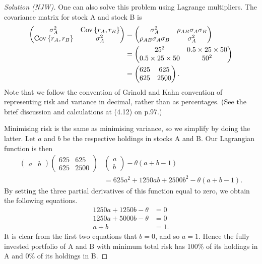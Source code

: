 \begin{proof}[Solution (NJW)]
One can also solve this problem using Lagrange multipliers. The covariance matrix for stock A and stock B is 
\begin{align*}
\begin{pmatrix}
\sigma_{A}^{2} & \mathrm{Cov}\left\lbrace r_{A}, r_{B}\right\rbrace \\
\mathrm{Cov}\left\lbrace r_{A}, r_{B}\right\rbrace & \sigma_{A}^{2}
\end{pmatrix}
&=
\begin{pmatrix}
\sigma_{A}^{2} & \rho_{AB}\sigma_{A}\sigma_{B} \\
\rho_{AB}\sigma_{A}\sigma_{B} & \sigma_{A}^{2}
\end{pmatrix}\\
&=
\begin{pmatrix}
25^{2} & 0.5 \times 25 \times 50 \\
0.5 \times 25 \times 50 & 50^{2}
\end{pmatrix}\\
&=
\begin{pmatrix}
625 & 625 \\
625 & 2500
\end{pmatrix}.
\end{align*}
Note that we follow the convention of Grinold and Kahn convention of representing risk and variance in decimal, rather than as percentages. (See the brief discussion and calculations at (4.12) on p.97.)

Minimising risk is the same as minimising variance, so we simplify by doing the latter. Let $a$ and $b$ be the respective holdings in stocks A and B. Our Lagrangian function is then
\begin{align*}
\begin{pmatrix}
a & b
\end{pmatrix}
\begin{pmatrix}
625 & 625 \\
625 & 2500
\end{pmatrix}
&\begin{pmatrix}
a\\
b
\end{pmatrix}
- \theta(a + b - 1) \\
&= 625a^{2} + 1250ab + 2500b^{2} - \theta(a + b - 1).
\end{align*}
By setting the three partial derivatives of this function equal to zero, we obtain the following equations.
\begin{align*}
1250a + 1250b - \theta &= 0\\
1250a + 5000b - \theta &= 0\\
a + b &= 1.
\end{align*}
It is clear from the first two equations that $b = 0$, and so $a = 1$. Hence the fully invested portfolio of A and B with minimum total risk has 100\% of its holdings in A and 0\% of its holdings in B.
\end{proof}

